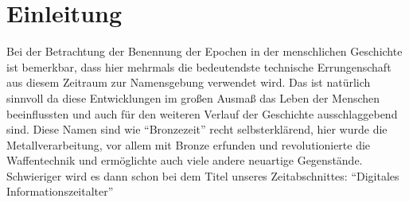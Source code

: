 \documentclass{scrarticle}
\begin{document}
    \section{Einleitung}
    Bei der Betrachtung der Benennung der Epochen in der menschlichen Geschichte ist bemerkbar, dass hier mehrmals die bedeutendste technische Errungenschaft aus diesem Zeitraum zur Namensgebung verwendet wird. Das ist natürlich sinnvoll da diese Entwicklungen im großen Ausmaß das Leben der Menschen beeinflussten und auch für den weiteren Verlauf der Geschichte ausschlaggebend sind. Diese Namen sind  wie \enquote{Bronzezeit} recht selbsterklärend, hier wurde die Metallverarbeitung, vor allem mit Bronze erfunden und revolutionierte die Waffentechnik und ermöglichte auch viele andere neuartige Gegenstände.\autocite{BronzezeitEuropaDeutschland} Schwieriger wird es dann schon bei dem Titel unseres Zeitabschnittes: \enquote{Digitales Informationszeitalter}
\end{document}
